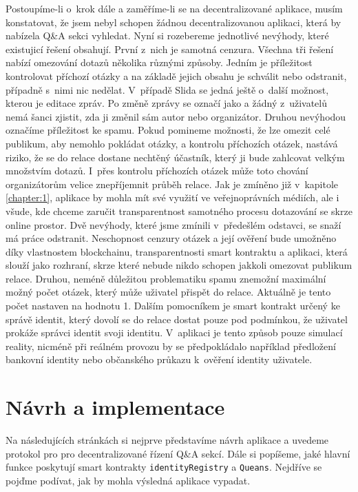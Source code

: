 Postoupíme-li o~krok dále a zaměříme-li se na decentralizované aplikace, musím konstatovat, že jsem nebyl schopen žádnou decentralizovanou aplikaci, která by nabízela Q\&A sekci vyhledat. 
Nyní si rozebereme jednotlivé nevýhody, které existujicí řešení obsahují. První z~nich je samotná cenzura. Všechna tři řešení nabízí omezování dotazů několika různými způsoby. Jedním je příležitost kontrolovat příchozí otázky a na základě jejich obsahu je schválit nebo odstranit, případně s~nimi nic nedělat. V~případě Slida se jedná ještě o~další možnost, kterou je editace zpráv. Po změně zprávy se označí jako  a žádný z~uživatelů nemá šanci zjistit, zda ji změnil sám autor nebo organizátor. Druhou nevýhodou označíme příležitost ke spamu. Pokud pomineme možnosti, že lze omezit celé publikum, aby nemohlo pokládat otázky, a kontrolu příchozích otázek, nastává riziko, že se do relace dostane nechtěný účastník, který ji bude zahlcovat velkým množstvím dotazů. I~přes kontrolu příchozích otázek může toto chování organizátorům velice znepříjemnit průběh relace.
Jak je zmíněno již v~kapitole \ref{chapter:1}, aplikace by mohla mít své využití ve veřejnoprávních médiích, ale i všude, kde chceme zaručit transparentnost samotného procesu dotazování se skrze online prostor. Dvě nevýhody, které jsme zmínili v~předešlém odstavci, se snaží má práce odstranit. Neschopnost cenzury otázek a její ověření bude umožněno díky vlastnostem blockchainu, transparentnosti smart kontraktu a aplikaci, která slouží jako rozhraní, skrze které nebude nikdo schopen jakkoli omezovat publikum relace. Druhou, neméně důležitou problematiku spamu znemožní maximální možný počet otázek, který může uživatel přispět do relace. Aktuálně je tento počet nastaven na hodnotu 1. Dalším pomocníkem je smart kontrakt určený ke správě identit, který dovolí se do relace dostat pouze pod podmínkou, že uživatel prokáže správci identit svoji identitu. V~aplikaci je tento způsob pouze simulací reality, nicméně při reálném provozu by se předpokládalo například předložení bankovní identity nebo občanského průkazu k~ověření identity uživatele.
\chapter{Návrh a implementace}
\label{chapter:6}
Na následujících stránkách si nejprve představíme návrh aplikace a uvedeme protokol pro pro decentralizované řízení Q\&A sekcí. Dále si popíšeme, jaké hlavní funkce poskytují smart kontrakty \texttt{identityRegistry} a \texttt{Queans}. Nejdříve se pojďme podívat, jak by mohla výsledná aplikace vypadat.  


